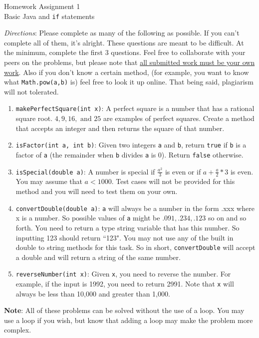 \documentclass[11pt,fleqn]{article}
\theoremstyle{definition}
\begin{document}
\begin{center}
{\Huge
Homework Assignment 1
}\\
Basic Java and \texttt{if} statements
\end{center}

\textit{Directions}: Please complete as many of the following as possible. If
you can't complete all of them, it's alright. These questions are meant to
be difficult. At the minimum, complete the first 3 questions. Feel free to
collaborate with your peers on the problems, but please note that \underline{all
submitted work must be your own work}. Also if you don't know a certain method,
(for example, you want to know what \texttt{Math.pow(a,b)} is) feel free to look it
up online. That being said, plagiarism will not tolerated.  

\begin{enumerate}[Q1.]

\item
\texttt{makePerfectSquare(int x)}: A perfect square is a number that has a rational square root. $4, 9, 16, \text{ and } 25$ are examples of perfect squares. Create a method that accepts an integer and then returns the square of that number.

\item
\texttt{isFactor(int a, int b)}: Given two integers \texttt{a} and \texttt{b}, return \texttt{true} if \texttt{b} is a factor of \texttt{a} (the remainder when \texttt{b} divides \texttt{a} is 0). Return \texttt{false} otherwise.

\item
\texttt{isSpecial(double a)}: A number is special if $\frac{a^2}{3}$ is even or if
$a + \frac{a}{2} * 3$ is even. You may assume that $a<1000$. Test cases will not
be provided for this method and you will need to test them on your own. 

\item
\texttt{convertDouble(double a)}: \texttt{a} will always be a number in the form
.xxx where x is a number. So possible values of \texttt{a} might be $.091, .234,
.123$ so on and so forth. You need to return a type string variable that has
this number. So inputting 123 should return ``123". You may not use any of the
built in double to string methods for this task.  
 So in short, \texttt{convertDouble} will accept a double  and will
return a string of the same number. 

\item
\texttt{reverseNumber(int x)}: Given \texttt{x}, you need to reverse the number.
For example, if the input is 1992, you need to return 2991. Note that \texttt{x}
will always be less than 10,000 and greater than 1,000. 

\end{enumerate}

\textbf{Note}: All of these problems can be solved without the use of a loop.
You may use a loop if you wish, but know that adding a loop may make the problem
more complex. 
\end{document}
